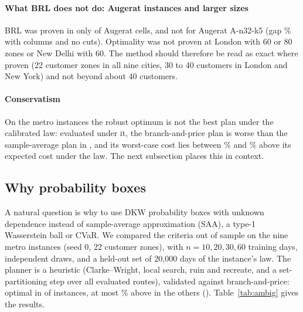 \documentclass[preprint,11pt]{elsarticle}
\theoremstyle{definition}
\theoremstyle{remark}
\begin{document}
\paragraph{What BRL does not do: Augerat instances and larger sizes} BRL was proven in only \BrlAugeratProvenN{} of \BrlAugeratCells{} Augerat cells, and not for Augerat A-n32-k5 (gap \BrlAugGap\% with \BrlAugCols{} columns and no cuts). Optimality was not proven at London with 60 or 80 zones or New Delhi with 60. The method should therefore be read as exact where proven (22 customer zones in all nine cities, 30 to 40 customers in London and New York) and not beyond about 40 customers.

\paragraph{Conservatism} On the metro instances the robust optimum is not the best plan under the calibrated law: evaluated under it, the branch-and-price plan is worse than the sample-average plan in \BPtrueWorse, and its worst-case cost lies between \BPconsMin\% and \BPconsMax\% above its expected cost under the law. The next subsection places this in context.

\subsection{Why probability boxes}\label{sec:res-pbox}

A natural question is why to use DKW probability boxes with unknown dependence instead of sample-average approximation (SAA), a type-1 Wasserstein ball or CVaR. We compared the criteria out of sample on the nine metro instances (seed 0, 22 customer zones), with $n=10,20,30,60$ training days, \AmbDraws{} independent draws, and a held-out set of 20{,}000 days of the instance's law. The planner is a heuristic (Clarke--Wright, local search, ruin and recreate, and a set-partitioning step over all evaluated routes), validated against branch-and-price: optimal in \AmbValOptN{} of \AmbValRows{} instances, at most \AmbValMaxGap\% above in the others (\AmbValMaxCity). Table~\ref{tab:ambig} gives the results.

\begin{table}[tbp]\centering\small
\caption{Out-of-sample comparison of criteria on the nine metro instances (mean over \AmbDraws{} draws and cities). Regret: expected cost of the plan above the best known plan for the true law, \%. Other columns at $n=20$: probability that at least one route runs overtime on a day; CVaR$_{0.95}$ of the daily plan cost above the best known expected cost; criterion value minus realised expected cost.}\label{tab:ambig}
\end{table}
\end{document}
